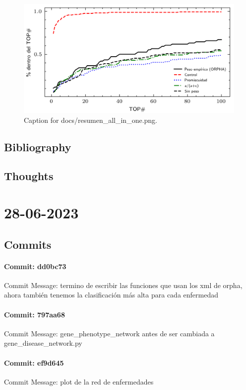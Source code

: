 \documentclass{article}
\begin{document}
\begin{figure}[h] \centering \includegraphics{docs/resumen_all_in_one.png} \caption{Caption for docs/resumen_all_in_one.png.} \end{figure}
\subsection{Bibliography}
\subsection{Thoughts}

\section{28-06-2023}
\subsection{Commits}
\paragraph{Commit: dd0bc73}
Commit Message: termino de escribir las funciones que usan los xml de orpha, ahora también tenemos la clasificación más alta para cada enfermedad

\paragraph{Commit: 797aa68}
Commit Message: gene_phenotype_network antes de ser cambiada a gene_disease_network.py

\paragraph{Commit: ef9d645}
Commit Message: plot de la red de enfermedades
\end{document}
